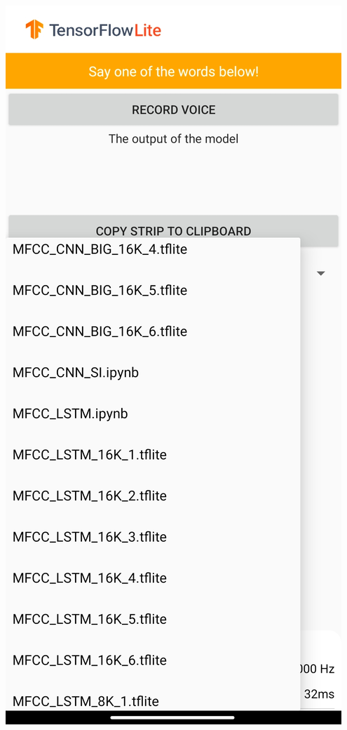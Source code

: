 \documentclass{report}
\theoremstyle{definition}
\theoremstyle{remark}
\begin{document}
\begin{minipage}{\textwidth}
\begin{minipage}{.5\textwidth}
    \label{fig:theApp}
\end{minipage}
\begin{minipage}{.5\textwidth}
    \centering
    \includegraphics[scale=0.1]{img/app_2.jpg}
    \label{fig:theApp}
\end{minipage}
\end{minipage}
\end{document}
